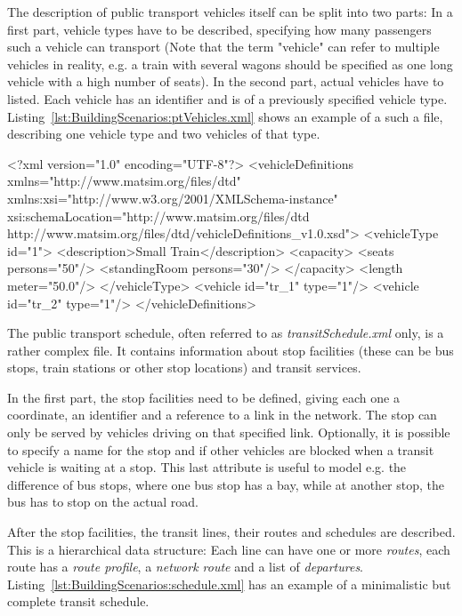 The description of public transport vehicles itself can be split into two parts:
In a first part, vehicle types have to be described, specifying how many
passengers such a vehicle can transport (Note that the term "vehicle" can refer
to multiple vehicles in reality, e.g. a train with several wagons should be specified as
one long vehicle with a high number of seats). In the second part, actual
vehicles have to listed. Each vehicle has an identifier and is of a previously
specified vehicle type. Listing~\ref{lst:BuildingScenarios:ptVehicles.xml} shows
an example of a such a file, describing one vehicle type and two vehicles of
that type.

\begin{xml-file}[caption=An example of transitVehicles.xml,
label=lst:BuildingScenarios:ptVehicles.xml]
<?xml version="1.0" encoding="UTF-8"?>
<vehicleDefinitions xmlns="http://www.matsim.org/files/dtd"
       xmlns:xsi="http://www.w3.org/2001/XMLSchema-instance"
       xsi:schemaLocation="http://www.matsim.org/files/dtd 
                     http://www.matsim.org/files/dtd/vehicleDefinitions_v1.0.xsd">
<vehicleType id="1">
		<description>Small Train</description>
		<capacity>
			<seats persons="50"/>
			<standingRoom persons="30"/>
		</capacity>
		<length meter="50.0"/>
	</vehicleType>
	<vehicle id="tr_1" type="1"/>
	<vehicle id="tr_2" type="1"/>
</vehicleDefinitions>
\end{xml-file}

The public transport schedule, often referred to as \emph{transitSchedule.xml}
only, is a rather complex file. It contains information about stop facilities
(these can be bus stops, train stations or other stop locations) and transit
services.

In the first part, the stop facilities need to be defined, giving each one a
coordinate, an identifier and a reference to a link in the network. The stop can
only be served by vehicles driving on that specified link. Optionally, it is
possible to specify a name for the stop and if other vehicles are blocked
when a transit vehicle is waiting at a stop. This last attribute is useful to
model e.g. the difference of bus stops, where one bus stop has a bay, while at
another stop, the bus has to stop on the actual road.

After the stop facilities, the transit lines, their routes and schedules
are described. This is a hierarchical data structure: Each line can have one or
more \emph{routes}, each route has a \emph{route profile}, a \emph{network
route} and a list of \emph{departures}.
Listing~\ref{lst:BuildingScenarios:schedule.xml} has an example of a
minimalistic but complete transit schedule.

